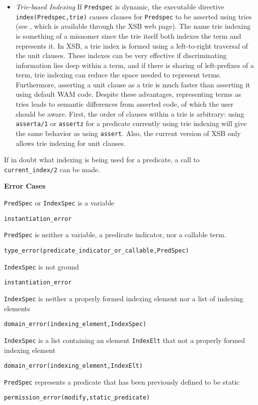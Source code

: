 \begin{description}
\begin{itemize}
\item {\em Trie-based Indexing} 
%
If {\tt Predspec} is dynamic, the executable directive {\tt
  index(Predspec,trie)} causes clauses for {\tt Predspec} to be
asserted using tries (see \cite{RRSSW98}, which is available through
the XSB web page).  The name trie indexing is something of a misnomer
since the trie itself both indexes the term and represents it.  In
XSB, a trie index is formed using a left-to-right traversal of the
unit clauses.  These indexes can be very effective if discriminating
information lies deep within a term, and if there is sharing of
left-prefixes of a term, trie indexing can reduce the space needed to
represent terms.  Furthermore, asserting a unit clause as a trie is
much faster than asserting it using default WAM code.  
Despite these advantages, representing terms as tries leads to
semantic differences from asserted code, of which the user should be
aware.  First, the order of clauses within a trie is arbitrary: using
{\tt asserta/1} or {\tt assertz} for a predicate currently using trie
indexing will give the same behavior as using {\tt assert}.  Also, the
current version of XSB only allows trie indexing for unit clauses.
\end{itemize}

If in doubt what indexing is being used for a predicate, a call to
{\tt current\_index/2} can be made.

{\bf Error Cases}
\bi
\item 	{\tt PredSpec} or {\tt IndexSpec} is a variable
\bi
\item {\tt instantiation\_error}
\ei
\item {\tt PredSpec} is neither a variable, a predicate indicator, nor a 
  callable term.
\bi
\item 	{\tt type\_error(predicate\_indicator\_or\_callable,PredSpec)}
\ei
\item {\tt IndexSpec} is not ground
\bi
\item 	{\tt instantiation\_error}
\ei
\item {\tt IndexSpec} is neither a properly formed indexing element
  nor a list of indexing elements 
\bi
\item 	{\tt domain\_error(indexing\_element,IndexSpec)}
\ei
\item {\tt IndexSpec} is a list containing an element {\tt IndexElt}
  that not a properly formed indexing element
\bi
\item 	{\tt domain\_error(indexing\_element,IndexElt)}
\ei
\item {\tt PredSpec} represents a predicate that has been previously
  defined to be static 
\bi
\item 	{\tt permission\_error(modify,static\_predicate)}
\ei
\ei


\end{description}
